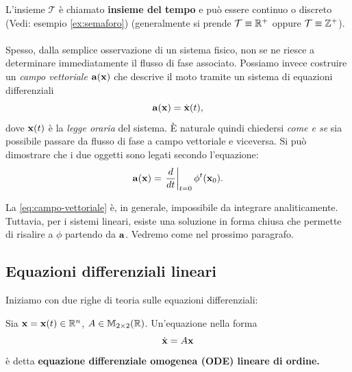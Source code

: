 L'insieme $\mathcal T$ è chiamato \textbf{insieme del tempo} e può essere continuo
o discreto (Vedi: esempio \ref{ex:semaforo}) (generalmente si prende $\mathcal T \equiv \mathbb{R}^+$ oppure $\mathcal T \equiv \mathbb{Z}^+$).

\paragraph{}
Spesso, dalla semplice osservazione di un sistema fisico, non se ne riesce a determinare
immediatamente il flusso di fase associato. Possiamo invece costruire un \emph{campo vettoriale} $\mathbf{a}(\mathbf{x})$
che descrive il moto tramite un sistema di equazioni differenziali
\begin{equation*}
    \mathbf{a}(\mathbf{x}) = \dot {\mathbf{x}} (t),
\end{equation*}
dove $\mathbf{x}(t)$ è la \emph{legge oraria} del sistema.
È naturale quindi chiedersi \emph{come e se} sia possibile passare da flusso di
fase a campo vettoriale e viceversa. Si può dimostrare  che
i due oggetti sono legati secondo l'equazione:
\begin{equation}
    \mathbf{a} (\mathbf{x}) = \left.\frac d {dt} \right| _{t=0} \phi^t (\mathbf{x}_0).
    \label{eq:campo-vettoriale}
\end{equation}

La \eqref{eq:campo-vettoriale} è, in generale, impossibile da integrare analiticamente.
Tuttavia, per i sistemi lineari, esiste una soluzione in forma chiusa che permette di
risalire a $\phi$ partendo da $\mathbf{a}$. Vedremo come nel prossimo paragrafo.



\subsection{Equazioni differenziali lineari}
Iniziamo con due righe di teoria sulle equazioni differenziali:

\begin{definition}
    Sia $\mathbf{x} = \mathbf{x}(t) \in \mathbb{R}^n$, $A \in \mathbb{M}_{2\times 2}(\mathbb{R})$. Un'equazione nella forma
    \begin{equation}
        \dot{\mathbf{x}} = A \mathbf{x}
        \label{eq:sistema-lineare}
    \end{equation}
    è detta \textbf{equazione differenziale omogenea (\textsc{ODE}) lineare di  ordine.}
    \label{def:sistema-lineare}
\end{definition}

